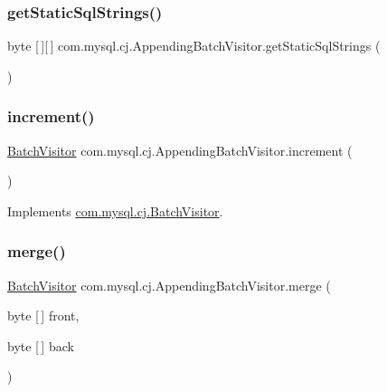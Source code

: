 \subsubsection{\texorpdfstring{get\+Static\+Sql\+Strings()}{getStaticSqlStrings()}}
{\footnotesize\ttfamily byte \mbox{[}$\,$\mbox{]}\mbox{[}$\,$\mbox{]} com.\+mysql.\+cj.\+Appending\+Batch\+Visitor.\+get\+Static\+Sql\+Strings (\begin{DoxyParamCaption}{ }\end{DoxyParamCaption})}

\mbox{\label{classcom_1_1mysql_1_1cj_1_1_appending_batch_visitor_ad594c2e002438dcbc9079af8ee99c3c1}} 
\subsubsection{\texorpdfstring{increment()}{increment()}}
{\footnotesize\ttfamily \mbox{\hyperlink{interfacecom_1_1mysql_1_1cj_1_1_batch_visitor}{Batch\+Visitor}} com.\+mysql.\+cj.\+Appending\+Batch\+Visitor.\+increment (\begin{DoxyParamCaption}{ }\end{DoxyParamCaption})}



Implements \mbox{\hyperlink{interfacecom_1_1mysql_1_1cj_1_1_batch_visitor_a4778f6e4d4c046653767d232f547c1f2}{com.\+mysql.\+cj.\+Batch\+Visitor}}.

\mbox{\label{classcom_1_1mysql_1_1cj_1_1_appending_batch_visitor_a75f638cd1726c922c747767d693c0288}} 
\subsubsection{\texorpdfstring{merge()}{merge()}}
{\footnotesize\ttfamily \mbox{\hyperlink{interfacecom_1_1mysql_1_1cj_1_1_batch_visitor}{Batch\+Visitor}} com.\+mysql.\+cj.\+Appending\+Batch\+Visitor.\+merge (\begin{DoxyParamCaption}\item[{byte \mbox{[}$\,$\mbox{]}}]{front,  }\item[{byte \mbox{[}$\,$\mbox{]}}]{back }\end{DoxyParamCaption})}



